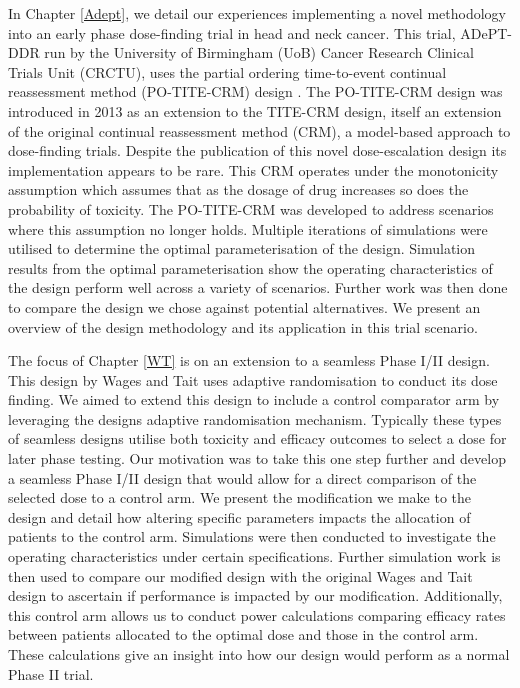 In Chapter \ref{Adept}, we detail our experiences implementing a novel methodology into an early phase dose-finding trial in head and neck cancer. This trial, ADePT-DDR run by the University of Birmingham (UoB) Cancer Research Clinical Trials Unit (CRCTU), uses the partial ordering time-to-event continual reassessment method (PO-TITE-CRM) design \cite{wagesUsingTimetoeventContinual2013}. The PO-TITE-CRM design was introduced in 2013 as an extension to the TITE-CRM design, itself an extension of the original continual reassessment method (CRM), a model-based approach to dose-finding trials. Despite the publication of this novel dose-escalation design its implementation appears to be rare. This CRM operates under the monotonicity assumption which assumes that as the dosage of drug increases so does the probability of toxicity. The PO-TITE-CRM was developed to address scenarios where this assumption no longer holds. Multiple iterations of simulations were utilised to determine the optimal parameterisation of the design. Simulation results from the optimal parameterisation show the operating characteristics of the design perform well across a variety of scenarios. Further work was then done to compare the design we chose against potential alternatives. We present an overview of the design methodology and its application in this trial scenario.

The focus of Chapter \ref{WT} is on an extension to a seamless Phase \RN{1}/\RN{2} design. This design by Wages and Tait \cite{wagesSeamlessPhaseII2015} uses adaptive randomisation to conduct its dose finding. We aimed to extend this design to include a control comparator arm by leveraging the designs adaptive randomisation mechanism. Typically these types of seamless designs utilise both toxicity and efficacy outcomes to select a dose for later phase testing. Our motivation was to take this one step further and develop a seamless Phase \RN{1}/\RN{2} design that would allow for a direct comparison of the selected dose to a control arm. We present the modification we make to the design and detail how altering specific parameters impacts the allocation of patients to the control arm. Simulations were then conducted to investigate the operating characteristics under certain specifications. Further simulation work is then used to compare our modified design with the original Wages and Tait design to ascertain if performance is impacted by our modification. Additionally, this control arm allows us to conduct power calculations comparing efficacy rates between patients allocated to the optimal dose and those in the control arm. These calculations give an insight into how our design would perform as a normal Phase \RN{2} trial. 

